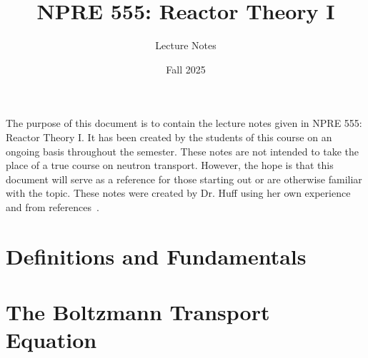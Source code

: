 \documentclass{lecture_notes}
\title{NPRE 555: Reactor Theory I}
\subtitle{Lecture Notes}
\date{Fall 2025}
\begin{document}
\frontmatter

\begin{foreword}
  The purpose of this document is to contain the lecture notes given in NPRE 555: Reactor Theory I.
  It has been created by the students of this course on an ongoing basis throughout the semester.
  These notes are not intended to take the place of a true course on neutron transport.
  However, the hope is that this document will serve as a reference for those starting out or are otherwise familiar with the topic.
  These notes were created by Dr. Huff using her own experience and from references~\cite{bellNuclear_reactor_theory_bell_glasstone1970,duderstadtTransportTheory1979,lewisComputationalMethodsNeutron1993,staceyNuclearReactorPhysics2007}.
\end{foreword}

\tableofcontents
\clearpage

\pagestyle{fancy} %
\fancyhf{}
\fancyfoot[C]{\thepage} %
\setcounter{page}{1}

\section{Definitions and Fundamentals}


\section{The Boltzmann Transport Equation}


\clearpage
\appendix

\clearpage


\end{document}
